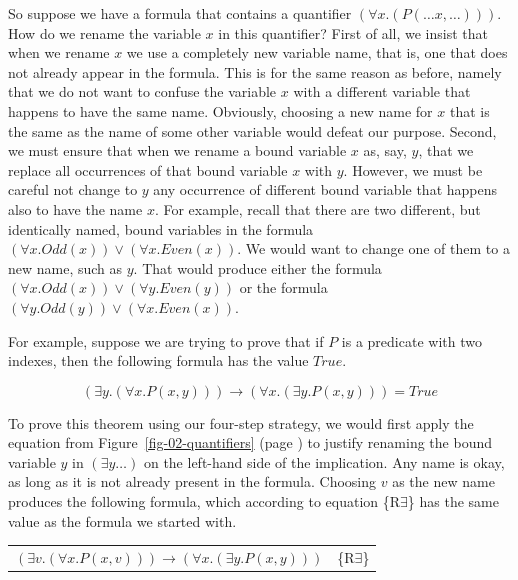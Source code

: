 {{So suppose we have a formula that contains
a quantifier $(\forall x.(P(\dots x, \dots)))$.
How do we rename the variable $x$ in this quantifier?
First of all, we insist that when we rename $x$ we use a completely new variable name,
that is, one that does
not already appear in the formula.
This is for the same reason as before, namely that we do not want to confuse the variable
$x$ with a different variable that happens to have the same name.
Obviously, choosing a new name for $x$ that is the same as the name
of some other variable would defeat our purpose.
Second, we must ensure that when we rename a bound variable $x$ as, say,
$y$, that we replace all occurrences of that bound variable $x$ with $y$.
However, we must be careful not change to $y$ any occurrence of different bound variable
that happens also to have the name $x$.
For example, recall that there are two different, but identically named,
bound variables in the formula
$(\forall x.Odd(x)) \vee (\forall x.Even(x))$.
We would want to change one of them to a new name, such as $y$.
That would produce either the formula
$(\forall x.Odd(x)) \vee (\forall y.Even(y))$ or the formula
$(\forall y.Odd(y)) \vee (\forall x.Even(x))$.

For example, suppose we are trying to prove that
if $P$ is a predicate with two indexes,
then the following formula has the value $True$.

$$(\exists y. (\forall x. P(x, y))) \rightarrow (\forall x. (\exists y. P(x, y))) = True$$

To prove this theorem using our four-step strategy,
we would first apply the
equation from Figure~\ref{fig-02-quantifiers} (page \pageref{fig-02-quantifiers})
to justify renaming the bound variable $y$ in $(\exists y\dots)$
on the left-hand side of the implication.
Any name is okay, as long as it is not already present in the formula.
Choosing $v$ as the new name produces the following formula,
which according to equation \{R$\exists$\} has the same value as
the formula we started with.

\begin{center}
\begin{tabular}{ll}
$(\exists v. (\forall x. P(x, v))) \rightarrow (\forall x. (\exists y. P(x, y)))$ & \{R$\exists$\} \\
\end{tabular}
\end{center}

}}
